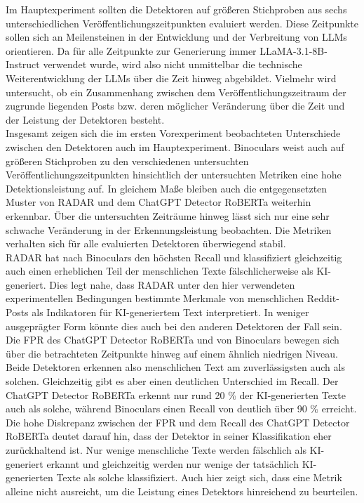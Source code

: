 Im Hauptexperiment sollten die Detektoren auf größeren Stichproben aus sechs unterschiedlichen Veröffentlichungszeitpunkten evaluiert werden. Diese Zeitpunkte sollen sich an Meilensteinen in der Entwicklung und der Verbreitung von LLMs orientieren. Da für alle Zeitpunkte zur Generierung immer LLaMA-3.1-8B-Instruct verwendet wurde, wird also nicht unmittelbar die technische Weiterentwicklung der LLMs über die Zeit hinweg abgebildet. Vielmehr wird untersucht, ob ein Zusammenhang zwischen dem Veröffentlichungszeitraum der zugrunde liegenden Posts bzw. deren möglicher Veränderung über die Zeit und der Leistung der Detektoren besteht. \\
Insgesamt zeigen sich die im ersten Vorexperiment beobachteten Unterschiede zwischen den Detektoren auch im Hauptexperiment. Binoculars weist auch auf größeren Stichproben zu den verschiedenen untersuchten Veröffentlichungszeitpunkten hinsichtlich der untersuchten Metriken eine hohe Detektionsleistung auf. In gleichem Maße bleiben auch die entgegensetzten Muster von RADAR und dem ChatGPT Detector RoBERTa weiterhin erkennbar. Über die untersuchten Zeiträume hinweg lässt sich nur eine sehr schwache Veränderung in der Erkennungsleistung beobachten. Die Metriken verhalten sich für alle evaluierten Detektoren überwiegend stabil. \\
RADAR hat nach Binoculars den höchsten Recall und klassifiziert gleichzeitig auch einen erheblichen Teil der menschlichen Texte fälschlicherweise als KI-generiert. Dies legt nahe, dass RADAR unter den hier verwendeten experimentellen Bedingungen bestimmte Merkmale von menschlichen Reddit-Posts als Indikatoren für KI-generiertem Text interpretiert. In weniger ausgeprägter Form könnte dies auch bei den anderen Detektoren der Fall sein. Die FPR des ChatGPT Detector RoBERTa und von Binoculars bewegen sich über die betrachteten Zeitpunkte hinweg auf einem ähnlich niedrigen Niveau. Beide Detektoren erkennen also menschlichen Text am zuverlässigsten auch als solchen. Gleichzeitig gibt es aber einen deutlichen Unterschied im Recall. Der ChatGPT Detector RoBERTa erkennt nur rund 20 \% der KI-generierten Texte auch als solche, während Binoculars einen Recall von deutlich über 90 \% erreicht. Die hohe Diskrepanz zwischen der FPR und dem Recall des ChatGPT Detector RoBERTa deutet darauf hin, dass der Detektor in seiner Klassifikation eher zurückhaltend ist. Nur wenige menschliche Texte werden fälschlich als KI-generiert erkannt und gleichzeitig werden nur wenige der tatsächlich KI-generierten Texte als solche klassifiziert. Auch hier zeigt sich, dass eine Metrik alleine nicht ausreicht, um die Leistung eines Detektors hinreichend zu beurteilen.\\
